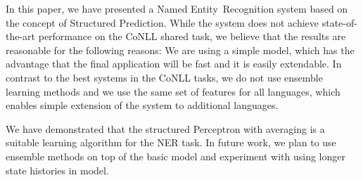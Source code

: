 \documentclass[11pt]{article}
\newcommand{\namedentity}{Named Entity}
\begin{document}
In this paper, we have presented a \namedentity~Recognition system based on the concept of Structured Prediction.
While the system does not achieve state-of-the-art performance on the CoNLL shared task, we believe that the results 
are reasonable for the following reasons: We are using a simple model, which has the advantage that the final application
will be fast and it is easily extendable. In contrast to the best systems in the CoNLL tasks, we do not use ensemble 
learning methods and we use the same set of features for all languages, which enables simple extension of the system to additional languages.

We have demonstrated that the structured Perceptron with averaging is a suitable learning algorithm for the NER task. In future work, we plan to use ensemble methods on top of the basic model and experiment with using longer state histories in model.




\end{document}

